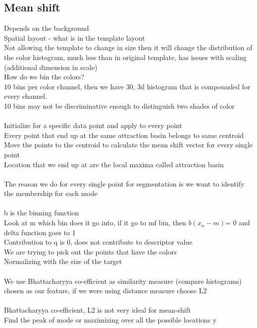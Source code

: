 \documentclass[11pt]{article}
\begin{document}
\subsection*{Mean shift}
Depends on the background\\
Spatial layout - what is in the template layout\\
Not allowing the template to change in size then it will change the distribution of the color histogram, much less than in original template, has issues with scaling (additional dimension in scale)
\\
How do we bin the colors?\\
10 bins per color channel, then we have 30, 3d histogram that is compounded for every channel.
\\
10 bins may not be discriminative enough to distinguish two shades of color\\
\\
Initialize for a specific data point and apply to every point\\
Every point that end up at the same attraction basin belongs to same centroid\\
Move the points to the centroid to calculate the mean shift vector for every single point\\
Location that we end up at are the local maxima called attraction basin\\\\
The reason we do for every single point for segmentation is we want to identify the membership for each mode
\\
\\
b is the binning function\\
Look at m which bin does it go into, if it go to mf bin, then $b(x_{n} - m) $= 0 and delta function goes to 1\\
Contribution to q is 0, does not contribute to descriptor value\\
We are trying to pick out the points that have the colors\\
Normalizing with the size of the target\\
\\
We use Bhattacharyya co-efficient as similarity measure (compare histograms) chosen as our feature,
if we were using distance measure choose L2\\\\
Bhattacharyya co-efficient, L2 is not very ideal for mean-shift\\
Find the peak of mode
or maximizing over all the possible locations y
\end{document}
